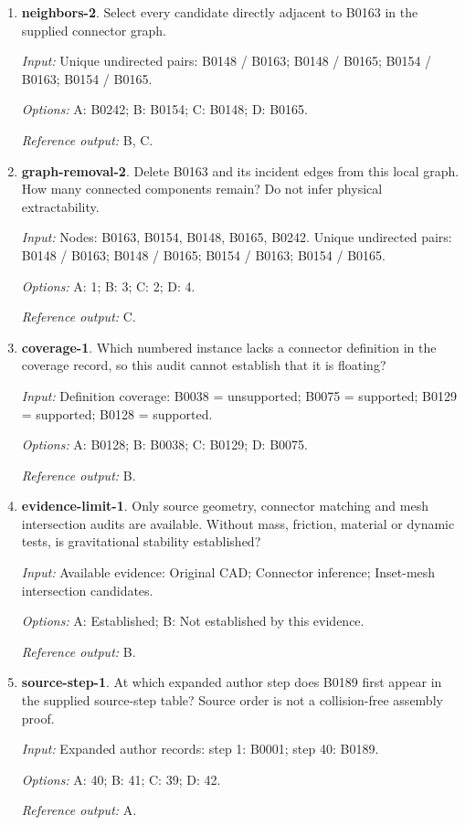 \begin{enumerate}
\item \textbf{neighbors-2}. Select every candidate directly adjacent to B0163 in the supplied connector graph.\par {\small \textit{Input:} Unique undirected pairs: B0148 / B0163; B0148 / B0165; B0154 / B0163; B0154 / B0165. \par\textit{Options:} A: B0242; B: B0154; C: B0148; D: B0165. \par\textit{Reference output:} B, C.}
\item \textbf{graph-removal-2}. Delete B0163 and its incident edges from this local graph. How many connected components remain? Do not infer physical extractability.\par {\small \textit{Input:} Nodes: B0163, B0154, B0148, B0165, B0242. Unique undirected pairs: B0148 / B0163; B0148 / B0165; B0154 / B0163; B0154 / B0165. \par\textit{Options:} A: 1; B: 3; C: 2; D: 4. \par\textit{Reference output:} C.}
\item \textbf{coverage-1}. Which numbered instance lacks a connector definition in the coverage record, so this audit cannot establish that it is floating?\par {\small \textit{Input:} Definition coverage: B0038 = unsupported; B0075 = supported; B0129 = supported; B0128 = supported. \par\textit{Options:} A: B0128; B: B0038; C: B0129; D: B0075. \par\textit{Reference output:} B.}
\item \textbf{evidence-limit-1}. Only source geometry, connector matching and mesh intersection audits are available. Without mass, friction, material or dynamic tests, is gravitational stability established?\par {\small \textit{Input:} Available evidence: Original CAD; Connector inference; Inset-mesh intersection candidates. \par\textit{Options:} A: Established; B: Not established by this evidence. \par\textit{Reference output:} B.}
\item \textbf{source-step-1}. At which expanded author step does B0189 first appear in the supplied source-step table? Source order is not a collision-free assembly proof.\par {\small \textit{Input:} Expanded author records: step 1: B0001; step 40: B0189. \par\textit{Options:} A: 40; B: 41; C: 39; D: 42. \par\textit{Reference output:} A.}

\end{enumerate}
